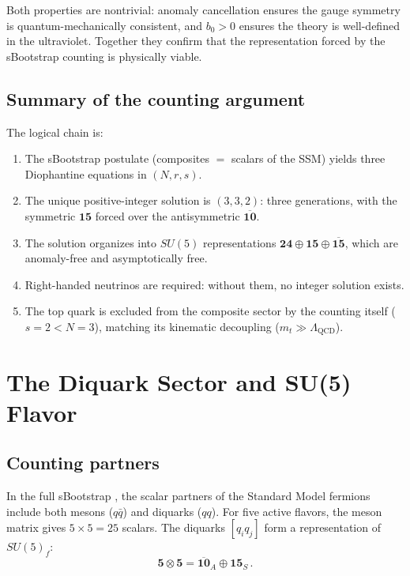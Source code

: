 \documentclass[12pt,a4paper]{article}
\begin{document}
\medskip
Both properties are nontrivial: anomaly cancellation ensures
the gauge symmetry is quantum-mechanically consistent, and
$b_0 > 0$ ensures the theory is well-defined in the ultraviolet.
Together they confirm that the representation forced by the
sBootstrap counting is physically viable.

\subsection{Summary of the counting argument}
The logical chain is:
\begin{enumerate}
\item The sBootstrap postulate (composites $=$ scalars of the SSM)
yields three Diophantine equations in $(N, r, s)$.
\item The unique positive-integer solution is $(3, 3, 2)$:
three generations, with the symmetric $\mathbf{15}$ forced over
the antisymmetric $\overline{\mathbf{10}}$.
\item The solution organizes into $SU(5)$ representations
$\mathbf{24} \oplus \mathbf{15} \oplus \overline{\mathbf{15}}$,
which are anomaly-free and asymptotically free.
\item Right-handed neutrinos are required: without them, no
integer solution exists.
\item The top quark is excluded from the composite sector by
the counting itself ($s = 2 < N = 3$), matching its
kinematic decoupling ($m_t \gg \Lambda_{\text{QCD}}$).
\end{enumerate}

\section{The Diquark Sector and SU(5) Flavor}
\label{sec:diquarks}

\subsection{Counting partners}

In the full sBootstrap \cite{Rivero2005}, the scalar partners of 
the Standard Model fermions include both mesons ($q\bar{q}$) and 
diquarks ($qq$). For five active flavors, the meson matrix gives 
$5 \times 5 = 25$ scalars. The diquarks $[q_i q_j]$ form a 
representation of $SU(5)_f$:
\begin{equation}
\mathbf{5} \otimes \mathbf{5} = \overline{\mathbf{10}}_A 
\oplus \mathbf{15}_S\,.
\end{equation}
\end{document}
